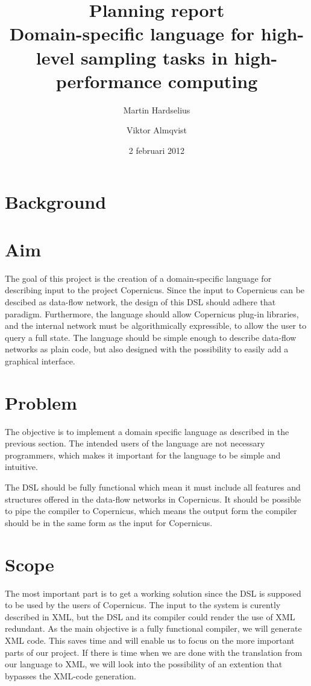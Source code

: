 \documentclass[a4paper]{article}
\title{Planning report\\
  \large{Domain-specific language for high-level
  sampling tasks in high-performance computing
  }
}
\author{Martin Hardselius \and Viktor Almqvist}
\date{2 februari 2012}
\begin{document}
\maketitle
\newpage

\section{Background}

\section{Aim}
The goal of this project is the creation of a domain-specific language
for describing input to the project Copernicus. Since the input to
Copernicus can be descibed as data-flow network, the design of this
DSL should adhere that paradigm. Furthermore, the language should
allow Copernicus plug-in libraries, and the internal network must be
algorithmically expressible, to allow the user to query a full
state. The language should be simple enough to describe data-flow
networks as plain code, but also designed with the possibility to
easily add a graphical interface.

\section{Problem}

The objective is to implement a domain specific language as described
in the previous section. The intended users of the language are not
necessary programmers, which makes it important for the language to be
simple and intuitive.

The DSL should be fully functional which mean it must include all
features and structures offered in the data-flow networks in
Copernicus. It should be possible to pipe the compiler to Copernicus,
which means the output form the compiler should be in the same form as
the input for Copernicus.


\section{Scope}
The most important part is to get a working solution since the DSL is
supposed to be used by the users of Copernicus. The input to the
system is curently described in XML, but the DSL and its compiler
could render the use of XML redundant. As the main objective is a
fully functional compiler, we will generate XML code. This saves time
and will enable us to focus on the more important parts of our
project. If there is time when we are done with the translation from
our language to XML, we will look into the possibility of an extention
that bypasses the XML-code generation.
\end{document}
